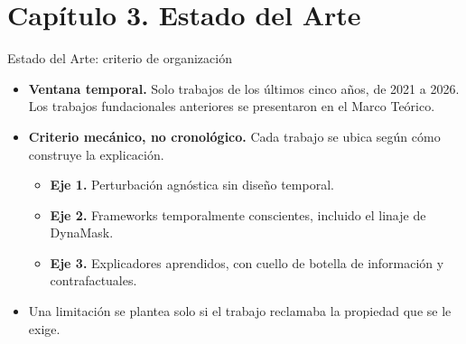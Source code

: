 \documentclass{beamer}
\begin{document}
\section[Capítulo 3]{Capítulo 3. Estado del Arte}

\begin{frame}{Estado del Arte: criterio de organización}
    \small
    \begin{itemize}
        \item \textbf{Ventana temporal.} Solo trabajos de los últimos
        cinco años, de 2021 a 2026. Los trabajos fundacionales anteriores
        se presentaron en el Marco Teórico.
        \vspace{0.15cm}
        \item \textbf{Criterio mecánico, no cronológico.} Cada trabajo se
        ubica según cómo construye la explicación.
        \begin{itemize}
            \item \textbf{Eje 1.} Perturbación agnóstica sin diseño
            temporal.
            \item \textbf{Eje 2.} Frameworks temporalmente conscientes,
            incluido el linaje de DynaMask.
            \item \textbf{Eje 3.} Explicadores aprendidos, con cuello de
            botella de información y contrafactuales.
        \end{itemize}
        \vspace{0.15cm}
        \item Una limitación se plantea solo si el trabajo reclamaba la
        propiedad que se le exige.
    \end{itemize}
\end{frame}
\end{document}
